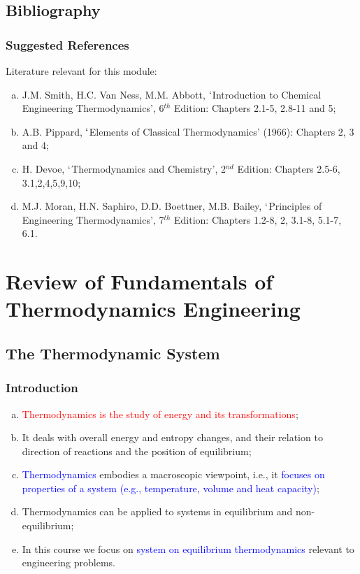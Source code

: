 \documentclass[10pt,compress,handout,ignorenonframetext]{beamer}
\newcommand{\red}{\textcolor{red}}
\newcommand{\blue}{\textcolor{blue}}
\begin{document}
 \subsection{Bibliography} 
   \begin{frame}
     \frametitle{Suggested References}
       Literature relevant for this module:
     \begin{enumerate}[(a)]
       \item J.M. Smith, H.C. Van Ness, M.M. Abbott, $\lq$Introduction to Chemical Engineering Thermodynamics', 6$^{th}$ Edition: Chapters 2.1-5, 2.8-11 and 5;
       \item A.B. Pippard, $\lq$Elements of Classical Thermodynamics' (1966): Chapters 2, 3 and 4;
       \item H. Devoe, $\lq$Thermodynamics and Chemistry', 2$^{nd}$ Edition: Chapters 2.5-6, 3.1,2,4,5,9,10;
       \item M.J. Moran, H.N. Saphiro, D.D. Boettner, M.B. Bailey, $\lq$Principles of Engineering Thermodynamics', 7$^{th}$ Edition: Chapters 1.2-8, 2, 3.1-8, 5.1-7, 6.1.
     \end{enumerate}
\end{frame}


 \section{Review of Fundamentals of Thermodynamics Engineering}

\subsection{The Thermodynamic System}
\begin{frame}
 \frametitle{Introduction}
  \begin{enumerate}[(a)]
   \item <1-> \red{Thermodynamics is the study of energy and its transformations};
   \item <2-> It deals with overall energy and entropy changes, and their relation to direction of reactions and the position of equilibrium;
   \item <3-> \blue{Thermodynamics} embodies a macroscopic viewpoint, i.e., it \blue{focuses on properties of a system (e.g., temperature, volume and heat capacity)};
   \item <4-> Thermodynamics can be applied to systems in equilibrium and non-equilibrium;
   \item <5-> In this course we focus on \blue{system on equilibrium thermodynamics} relevant to engineering problems.     
  \end{enumerate}
\end{frame}
\end{document}
